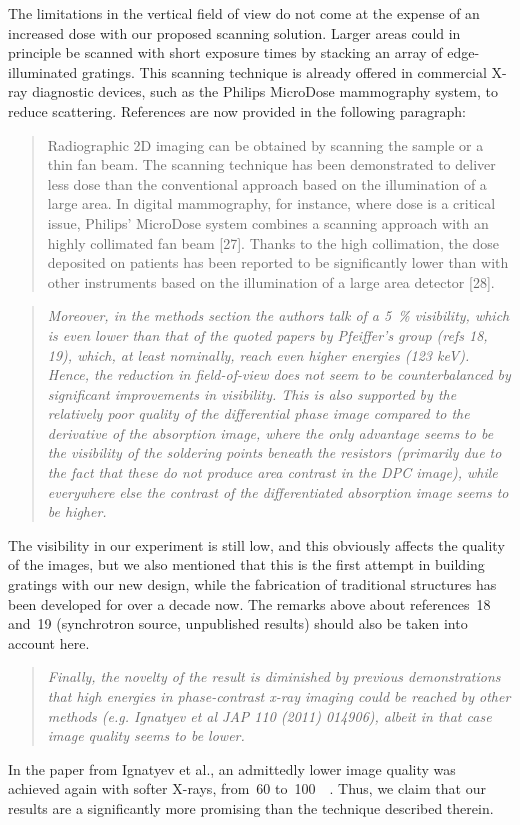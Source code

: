 \documentclass[a4paper,english]{scrartcl}
\newenvironment{reviewerquote}{\begin{quote}\itshape}{\end{quote}}
\begin{document}
The limitations in the vertical field of view do not come at the expense of
an increased dose with our proposed scanning solution. Larger areas could in
principle be scanned with short exposure times by stacking an array of
edge-illuminated gratings. This scanning technique is already offered in commercial X-ray
diagnostic devices, such as the Philips MicroDose mammography system, to
reduce scattering. References are now provided in the following paragraph:
\begin{quote}
 Radiographic 2D imaging can be obtained by scanning the sample or a
thin fan beam. The scanning technique has been demonstrated to deliver less dose than the
conventional approach based on the illumination of a large area. In digital mammography,
for instance, where dose is a critical issue, Philips’ MicroDose system combines a scanning
approach with an highly collimated fan beam [27]. Thanks to the high collimation, the dose
deposited on patients has been reported to be significantly lower than with other instruments
based on the illumination of a large area detector [28]. 
\end{quote}

\begin{reviewerquote}
    Moreover, in the methods section the authors talk of a
    \SI{5}{\percent} visibility, which is even lower than that of the quoted papers by Pfeiffer's group (refs 18, 19), which, at least nominally, reach even higher energies (123 keV). Hence, the reduction in field-of-view does not seem to be counterbalanced by significant improvements in visibility. This is also supported by the relatively poor quality of the differential phase image compared to the derivative of the absorption image, where the only advantage seems to be the visibility of the soldering points beneath the resistors (primarily due to the fact that these do not produce area contrast in the DPC image), while everywhere else the contrast of the differentiated absorption image seems to be higher.
\end{reviewerquote}
The visibility in our experiment is still low, and this obviously
affects the quality of the images, but we also mentioned
that this is the first attempt in building gratings with our new design,
while the fabrication of traditional structures has been developed for over
a decade now. The remarks above about references~18 and~19 (synchrotron
source, unpublished results) should also be taken into account here.
\begin{reviewerquote}
Finally, the novelty of the result is diminished by previous demonstrations that high energies in phase-contrast x-ray imaging could be reached by other methods (e.g. Ignatyev et al JAP 110 (2011) 014906), albeit in that case image quality seems to be lower.     
\end{reviewerquote}
In the paper from Ignatyev et al., an admittedly lower image quality was
achieved again with softer X-rays, from~\num{60}
to~\SI{100}{\kilo\voltpeak}. Thus, we claim that our results
are a significantly more promising than the technique described therein.
\end{document}
